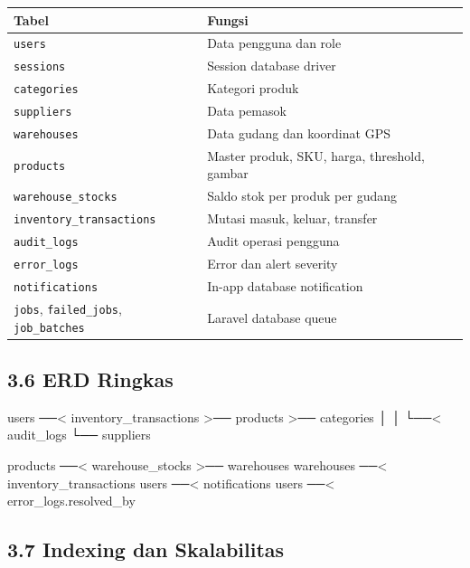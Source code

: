 \documentclass[
]{article}
\newenvironment{Shaded}{}{}
\newcommand{\NormalTok}[1]{#1}
\begin{document}
\begin{longtable}[]{@{}P{0.26\textwidth}P{0.70\textwidth}@{}}
\toprule\noalign{}
Tabel & Fungsi \\
\midrule\noalign{}
\endhead
\bottomrule\noalign{}
\endlastfoot
\texttt{users} & Data pengguna dan role \\
\texttt{sessions} & Session database driver \\
\texttt{categories} & Kategori produk \\
\texttt{suppliers} & Data pemasok \\
\texttt{warehouses} & Data gudang dan koordinat GPS \\
\texttt{products} & Master produk, SKU, harga, threshold, gambar \\
\texttt{warehouse\_stocks} & Saldo stok per produk per gudang \\
\texttt{inventory\_transactions} & Mutasi masuk, keluar, transfer \\
\texttt{audit\_logs} & Audit operasi pengguna \\
\texttt{error\_logs} & Error dan alert severity \\
\texttt{notifications} & In-app database notification \\
\texttt{jobs}, \texttt{failed\_jobs}, \texttt{job\_batches} & Laravel
database queue \\
\end{longtable}

\subsection{3.6 ERD Ringkas}\label{36-erd-ringkas}

\begin{Shaded}
\begin{Highlighting}[]
\NormalTok{users ──\textless{} inventory\_transactions \textgreater{}── products \textgreater{}── categories}
\NormalTok{  │                                  │}
\NormalTok{  └──\textless{} audit\_logs                    └── suppliers}

\NormalTok{products ──\textless{} warehouse\_stocks \textgreater{}── warehouses}
\NormalTok{warehouses ──\textless{} inventory\_transactions}
\NormalTok{users ──\textless{} notifications}
\NormalTok{users ──\textless{} error\_logs.resolved\_by}
\end{Highlighting}
\end{Shaded}

\subsection{3.7 Indexing dan
Skalabilitas}\label{37-indexing-dan-skalabilitas}
\end{document}
